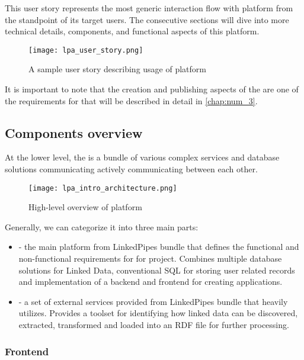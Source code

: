 This user story represents the most generic interaction flow with \lpa{} platform from the standpoint of its target users. The consecutive sections will dive into more technical details, components, and functional aspects of this platform. 

\begin{figure}[h]
    \centering
    \texttt{[image: lpa\_user\_story.png]}
    \caption{A sample user story describing usage of \lpa{} platform}
    \label{fig:lpa_user_story}
\end{figure}

It is important to note that the creation and publishing aspects of the \lpa{} are one of the requirements for \lpas{} that will be described in detail in \autoref{chap:num_3}. 

\subsection{Components overview}
\label{sssec:lpa_preliminaries_component_overview}

At the lower level, the \lpa{} is a bundle of various complex services and database solutions communicating actively communicating between each other. 

\begin{figure}[h]
    \centering
    \texttt{[image: lpa\_intro\_architecture.png]}
    \caption{High-level overview of \lpa{} platform}
    \label{fig:lpa_intro_architecture}
\end{figure}

Generally, we can categorize it into three main parts: 

\begin{itemize}
    \item \textbf{\fulllpa{}} - the main platform from LinkedPipes bundle that defines the functional and non-functional requirements for for \lpas{} project. Combines multiple database solutions for Linked Data, conventional SQL for storing user related records and implementation of a backend and frontend for creating applications.
    \item \textbf{\lps{}} - a set of external services provided from LinkedPipes bundle that \lpa{} heavily utilizes. Provides a toolset for identifying how linked data can be discovered, extracted, transformed and loaded into an RDF file for further processing.
\end{itemize}

\subsubsection{Frontend}
\label{ssssec:frontend_preliminaries}

